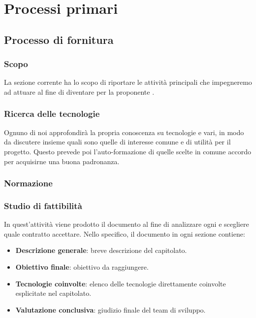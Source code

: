 \section{Processi primari}\label{PP}

    \subsection{Processo di fornitura}\label{PP:Fornitura}	%

        \subsubsection{Scopo}\label{PP:Fornitura:Scopo}
		La sezione corrente ha lo scopo di riportare le attività principali che impegneremo ad attuare al fine di
		diventare  per la proponente \II.

		\subsubsection{Ricerca delle tecnologie}
		Ognuno di noi approfondirà la propria conoscenza su tecnologie e  vari, in modo da discutere insieme quali sono
		quelle di interesse comune e di utilità per il progetto. Questo prevede poi l'auto-formazione di quelle scelte in comune accordo
		per acquisirne una buona padronanza.
		
		\subsubsection{Normazione} %

        \subsubsection{Studio di fattibilità}\label{PP:Fornitura:SdF}
        In quest'attività viene prodotto il documento \Doc{\SdFv} al fine di analizzare ogni  e scegliere quale contratto accettare.
        Nello specifico, il documento in ogni sezione contiene:
        	\begin{itemize}
        		\item \textbf{Descrizione generale}: breve descrizione del capitolato.
        		\item \textbf{Obiettivo finale}: obiettivo da raggiungere.
        		\item \textbf{Tecnologie coinvolte}: elenco delle tecnologie direttamente coinvolte esplicitate nel capitolato.
        		\item \textbf{Valutazione conclusiva}: giudizio finale del team di sviluppo.
        	\end{itemize}

